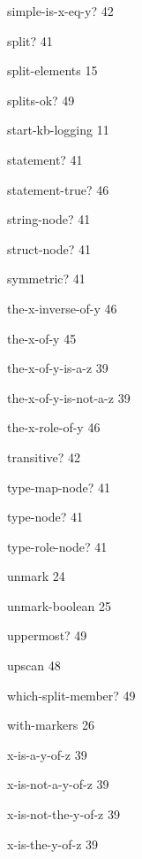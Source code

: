 \documentclass[titlepage,twoside,openright,11pt]{article}
\begin{document}
simple-is-x-eq-y? 42

split? 41

split-elements 15

splits-ok? 49

start-kb-logging 11

statement? 41

statement-true? 46

string-node? 41

struct-node? 41

symmetric? 41

the-x-inverse-of-y 46

the-x-of-y 45

the-x-of-y-is-a-z 39

the-x-of-y-is-not-a-z 39

the-x-role-of-y 46

transitive? 42

type-map-node? 41

type-node? 41

type-role-node? 41

unmark 24

unmark-boolean 25

uppermost? 49

upscan 48

which-split-member? 49

with-markers 26

x-is-a-y-of-z 39

x-is-not-a-y-of-z 39

x-is-not-the-y-of-z 39

x-is-the-y-of-z 39
\end{document}
